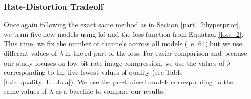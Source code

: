 \begin{figure}[H]
    \centering
    \qquad
    \caption[]{}
    \label{kd_lic_2}
\end{figure}

\subsubsection{Rate-Distortion Tradeoff}
Once again following the exact same method as in Section \ref{part_2:hyperprior}, we train five new models using \acrshort{kd} and the loss function from Equation \ref{loss_2}. This time, we fix the number of channels accross all models (i.e. 64) but we use different values of \(\lambda\) in the \acrshort{rd} part of the loss. For easier comparison and because our study focuses on low bit rate image compression, we use the values of \(\lambda\) corresponding to the five lowest values of \textsf{quality} (see Table \ref{tab_quality_lambda}). We use the pre-trained models corresponding to the same values of \(\lambda\) as a baseline to compare our results.

